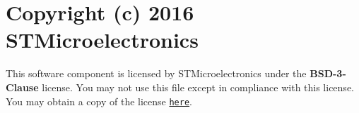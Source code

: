 \chapter{Copyright (c) 2016 STMicroelectronics }
\hypertarget{md__drivers_2_s_t_m32_f4xx___h_a_l___driver_2_license}{}\label{md__drivers_2_s_t_m32_f4xx___h_a_l___driver_2_license}
\label{md__drivers_2_s_t_m32_f4xx___h_a_l___driver_2_license_autotoc_md0}%
%


This software component is licensed by STMicroelectronics under the {\bfseries{BSD-\/3-\/\+Clause}} license. You may not use this file except in compliance with this license. You may obtain a copy of the license \href{https://opensource.org/licenses/BSD-3-Clause}{\texttt{here}}. 